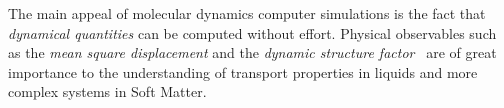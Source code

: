The main appeal of molecular dynamics computer simulations is the fact that
\emph{dynamical quantities} can be computed without effort. Physical observables such
as the \emph{mean square displacement} and the \emph{dynamic structure factor}~\cite{dhontIntroductionDynamicsColloids1996,hansenTheorySimpleLiquids2013}
are of great importance to the understanding of transport properties in liquids and
more complex systems in Soft Matter.